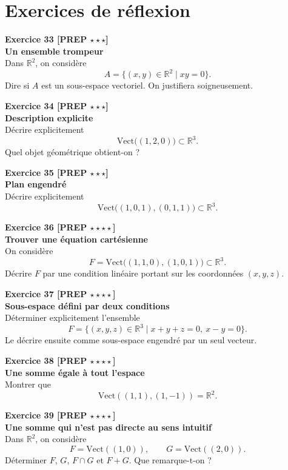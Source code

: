 \documentclass[11pt,a4paper]{article}
\begin{document}
\newpage

\section*{Exercices de réflexion}

\textbf{Exercice 33 [PREP $\star\star\star$]}\\
\textbf{Un ensemble trompeur}\\
Dans $\mathbb{R}^2$, on considère
\[
A=\{(x,y)\in\mathbb{R}^2\mid xy=0\}.
\]
Dire si $A$ est un sous-espace vectoriel. On justifiera soigneusement.

\textbf{Exercice 34 [PREP $\star\star\star$]}\\
\textbf{Description explicite}\\
Décrire explicitement
\[
\mathrm{Vect}\big((1,2,0)\big)\subset\mathbb{R}^3.
\]
Quel objet géométrique obtient-on ?

\textbf{Exercice 35 [PREP $\star\star\star$]}\\
\textbf{Plan engendré}\\
Décrire explicitement
\[
\mathrm{Vect}\big((1,0,1),(0,1,1)\big)\subset\mathbb{R}^3.
\]

\textbf{Exercice 36 [PREP $\star\star\star\star$]}\\
\textbf{Trouver une équation cartésienne}\\
On considère
\[
F=\mathrm{Vect}\big((1,1,0),(1,0,1)\big)\subset\mathbb{R}^3.
\]
Décrire $F$ par une condition linéaire portant sur les coordonnées $(x,y,z)$.

\textbf{Exercice 37 [PREP $\star\star\star\star$]}\\
\textbf{Sous-espace défini par deux conditions}\\
Déterminer explicitement l’ensemble
\[
F=\{(x,y,z)\in\mathbb{R}^3\mid x+y+z=0,\ x-y=0\}.
\]
Le décrire ensuite comme sous-espace engendré par un seul vecteur.

\textbf{Exercice 38 [PREP $\star\star\star\star$]}\\
\textbf{Une somme égale à tout l’espace}\\
Montrer que
\[
\mathrm{Vect}((1,1),(1,-1))=\mathbb{R}^2.
\]

\textbf{Exercice 39 [PREP $\star\star\star\star$]}\\
\textbf{Une somme qui n’est pas directe au sens intuitif}\\
Dans $\mathbb{R}^2$, on considère
\[
F=\mathrm{Vect}((1,0)),\qquad G=\mathrm{Vect}((2,0)).
\]
Déterminer $F$, $G$, $F\cap G$ et $F+G$. Que remarque-t-on ?
\end{document}
